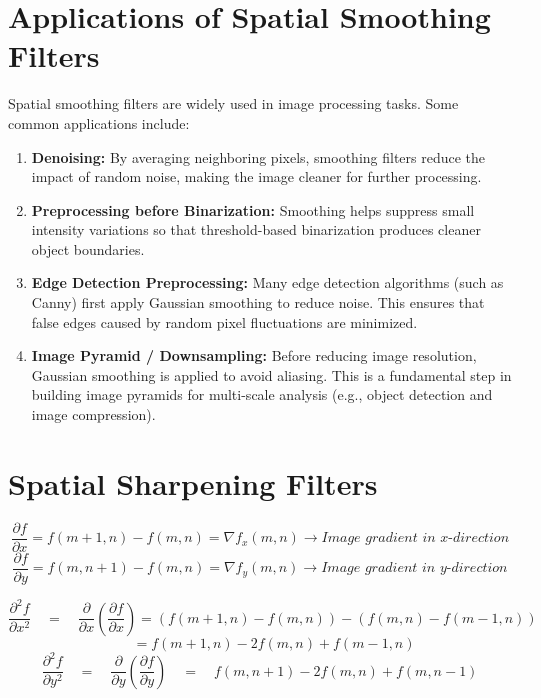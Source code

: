 \section{Applications of Spatial Smoothing Filters}
Spatial smoothing filters are widely used in image processing tasks. 
Some common applications include:
\begin{enumerate}
    \item \textbf{Denoising:} 
    By averaging neighboring pixels, smoothing filters reduce the impact 
    of random noise, making the image cleaner for further processing.

    \item \textbf{Preprocessing before Binarization:} 
    Smoothing helps suppress small intensity variations so that threshold-based 
    binarization produces cleaner object boundaries.

    \item \textbf{Edge Detection Preprocessing:} 
    Many edge detection algorithms (such as Canny) first apply Gaussian smoothing 
    to reduce noise. This ensures that false edges caused by random pixel fluctuations 
    are minimized.

    \item \textbf{Image Pyramid / Downsampling:} 
    Before reducing image resolution, Gaussian smoothing is applied to avoid aliasing. 
    This is a fundamental step in building image pyramids for multi-scale analysis 
    (e.g., object detection and image compression).
\end{enumerate}

\section{Spatial Sharpening Filters}
\[
\frac{\partial f}{\partial x} = f(m+1,n) - f(m,n) = \nabla f_x(m,n) \rightarrow \textit{Image gradient in x-direction}
\]
\[
\frac{\partial f}{\partial y} = f(m,n+1) - f(m,n)=\nabla f_y(m,n) \rightarrow \textit{Image gradient in y-direction}
\]

\[
\frac{\partial^2 f}{\partial x^2} 
\quad=\quad \frac{\partial}{\partial x}\!\left(\frac{\partial f}{\partial x}\right) 
= (f(m+1,n) - f(m,n)) - (f(m,n) - f(m-1,n)) 
\]
\[
\quad\quad= f(m+1,n) - 2f(m,n) + f(m-1,n)
\]
\[
\frac{\partial^2 f}{\partial y^2} 
\quad=\quad \frac{\partial}{\partial y}\!\left(\frac{\partial f}{\partial y}\right) 
\quad=\quad  f(m,n+1) - 2f(m,n) + f(m,n-1)
\]

